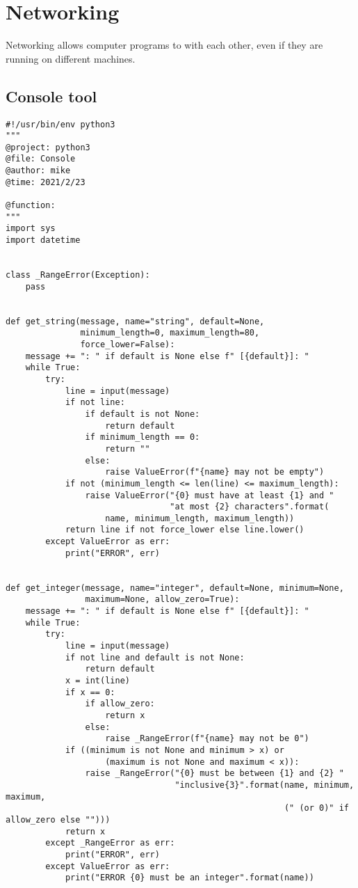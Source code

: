 
\chapter{Networking}

Networking allows computer programs to  with each other, even if they are running on different machines.

\section{Console tool}

\begin{lstlisting}
#!/usr/bin/env python3
"""
@project: python3
@file: Console
@author: mike
@time: 2021/2/23
 
@function:
"""
import sys
import datetime


class _RangeError(Exception):
    pass


def get_string(message, name="string", default=None,
               minimum_length=0, maximum_length=80,
               force_lower=False):
    message += ": " if default is None else f" [{default}]: "
    while True:
        try:
            line = input(message)
            if not line:
                if default is not None:
                    return default
                if minimum_length == 0:
                    return ""
                else:
                    raise ValueError(f"{name} may not be empty")
            if not (minimum_length <= len(line) <= maximum_length):
                raise ValueError("{0} must have at least {1} and "
                                 "at most {2} characters".format(
                    name, minimum_length, maximum_length))
            return line if not force_lower else line.lower()
        except ValueError as err:
            print("ERROR", err)


def get_integer(message, name="integer", default=None, minimum=None,
                maximum=None, allow_zero=True):
    message += ": " if default is None else f" [{default}]: "
    while True:
        try:
            line = input(message)
            if not line and default is not None:
                return default
            x = int(line)
            if x == 0:
                if allow_zero:
                    return x
                else:
                    raise _RangeError(f"{name} may not be 0")
            if ((minimum is not None and minimum > x) or
                    (maximum is not None and maximum < x)):
                raise _RangeError("{0} must be between {1} and {2} "
                                  "inclusive{3}".format(name, minimum, maximum,
                                                        (" (or 0)" if allow_zero else "")))
            return x
        except _RangeError as err:
            print("ERROR", err)
        except ValueError as err:
            print("ERROR {0} must be an integer".format(name))



\end{lstlisting}
